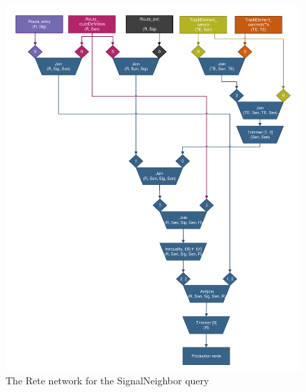 \begin{figure}[Htb]
\begin{center}
\includegraphics[scale=0.5]{figures/rete-signalneighbor-layout.pdf}
\caption{The Rete network for the \textsf{SignalNeighbor} query} 
\label{fig:rete-signalneighbor-layout}
\end{center}
\end{figure}

